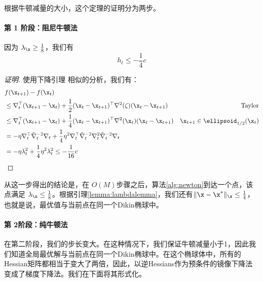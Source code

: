 根据牛顿减量的大小，这个定理的证明分为两步。
\paragraph{
    第 1 阶段：阻尼牛顿法
    }

\begin{lemma}
因为 $\lambda_\x \geq \frac{1}{8}$，我们有
$$ h_t \leq - \frac{1}{4} c $$
\end{lemma}
\begin{proof}[证明]
使用下降引理 相似的分析，我们有：
\begin{eqnarray*}
& f(\x_{t+1}) - f(\x_t) \\
& \leq \nabla_t^\top (\x_{t+1} - \x_t) + \frac{1}{2} (\x_t - \x_{t+1})^\top \nabla^2 (\zeta) (\x_t - \x_{t+1} ) & \mbox{Taylor} \\
& \leq \nabla_t^\top (\x_{t+1} - \x_t) +  \frac{1}{4} (\x_t - \x_{t+1})^\top \nabla^2 (\x_t) (\x_t - \x_{t+1} ) &  \x_{t+1} \in \ellipsoid_{1/2}(\x_t)   \\
& = - \eta \nabla_{t}^\top \tilde{\nabla}_{t}^{-2} \nabla_{t}  + \frac{1}{4} \eta^2 \nabla_t ^\top  \tilde{\nabla}^{-2}_t  \nabla_t^2 \tilde{\nabla}^{-2}_t \nabla_t    \\
& = - \eta \lambda_t^2 + \frac{1}{4} \eta^2 \lambda_t^2 \leq - \frac{1}{16} c
\end{eqnarray*}
\end{proof}
从这一步得出的结论是，在 $O(M)$步骤之后，算法\ref{alg:newton}到达一个点，该点满足 $\lambda_\x \leq \frac{1}{8}$。根据引理\ref{lemma:lambdalemma}，我们还有$\|\x - \x^* \|_\x \leq \frac{1}{4}$，也就是说，最优值与当前点在同一个Dikin椭球中。


\paragraph{
    第 2阶段：纯牛顿法
    } 

在第二阶段，我们的步长变大。在这种情况下，我们保证牛顿减量小于1，因此我们知道全局最优解与当前点在同一个Dikin椭球中。在这个椭球体中，所有的Hessian矩阵都相当于变大了两倍，因此，以逆Hessians作为预条件的镜像下降法变成了梯度下降法。我们在下面将其形式化。

